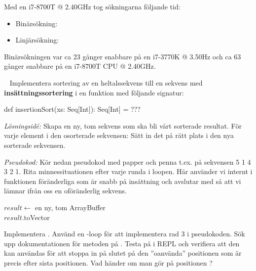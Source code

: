 Med en i7-8700T @ 2.40GHz tog sökningarna följande tid:
\begin{itemize}
\item Binärsökning: 
\item Linjärsökning: 
\end{itemize}




\SubtaskSolved
Binärsökningen var ca 23 gånger snabbare på en i7-3770K @ 3.50Hz och ca 63 gånger snabbare på en i7-8700T CPU @ 2.40GHz.



\QUESTEND






\QUESTBEGIN

\Task  \what~ Implementera sortering av en heltalssekvens till en  sekvens med \textbf{insättningssortering}  i en funktion med följande signatur:
\begin{Code}
def insertionSort(xs: Seq[Int]): Seq[Int] = ???
\end{Code}

\emph{Lösningsidé:} Skapa en ny, tom sekvens som ska bli vårt sorterade resultat. För varje element i den osorterade sekvensen: Sätt in det på rätt plats i den nya sorterade sekvensen.

\Subtask \emph{Pseudokod:} Kör nedan pseudokod med papper och penna t.ex. på sekvensen 5 1 4 3 2 1. Rita minnessituationen efter varje runda i loopen. Här använder vi internt i funktionen föränderliga  som är snabb på insättning och avslutar med  så att vi lämnar ifrån oss en oföränderlig sekvens.

\begin{algorithm}[H]
    $result \leftarrow$ en ny, tom ArrayBuffer \\
    $result$.toVector
\end{algorithm}


\Subtask Implementera . Använd en -loop för att implementera rad 3 i pseudokoden. Sök upp dokumentationen för metoden  på . Testa   på  i REPL och verifiera att den kan användas för att stoppa in på slutet på den ''oanvända'' positionen som är precis efter sista positionen. Vad händer om man gör  på positionen ?

